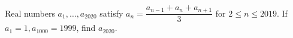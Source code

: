 Real numbers $a_1,\ldots,a_{2020}$ satisfy $a_n=\dfrac{a_{n-1}+a_n+a_{n+1}}{3}$ for $2\le n\le2019$. If $a_1=1,a_{1000}=1999$, find $a_{2020}$.
